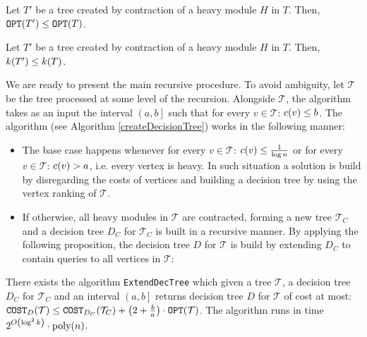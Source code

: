\begin{observation}
\label{monotonicityOfOptContraction}
    Let $T'$ be a tree created by contraction of a heavy module $H$ in $T$. Then, $\texttt{OPT}\mathopen{}\left( T' \right)\leq \texttt{OPT}\mathopen{}\left( T \right)$.
\end{observation}
\begin{observation}\label{monotonicityOfKContracion}
    Let $T'$ be a tree created by contraction of a heavy module $H$ in $T$. Then, $k\mathopen{}\left( T' \right)\leq k\mathopen{}\left( T \right)$.
\end{observation}


We are ready to present the main recursive procedure. To avoid ambiguity, let $\mathcal{T}$ be the tree processed at some level of the recursion. Alongside $\mathcal{T}$, the algorithm takes as an input the interval $\left(a,b\right]$ such that for every $v\in \mathcal{T}$: $c\mathopen{}\left( v \right)\leq b$. 
The algorithm (see Algorithm \ref{createDecisionTree}) works in the following manner: 


\begin{itemize}
    \item The base case happens whenever for every $v\in\mathcal{T}$: $c\mathopen{}\left( v \right)\leq\frac{1}{\log n}$ or for every $v\in\mathcal{T}$: $c\mathopen{}\left( v \right)>a$, i.e. every vertex is heavy. In such situation a solution is build by disregarding the costs of vertices and building a decision tree by using the vertex ranking of $\mathcal{T}$. 
    \item If otherwise, all heavy modules in $\mathcal{T}$ are contracted, forming a new tree $\mathcal{T}_C$ and a decision tree $D_{C}$ for $\mathcal{T}_C$ is built in a recursive manner. By applying the following proposition, the decision tree $D$ for $\mathcal{T}$ is build by extending $D_{C}$ to contain queries to all vertices in $\mathcal{T}$:
\end{itemize}
\begin{proposition}
\label{existanceOfExtensionAlgorithm}
There exists the algorithm \texttt{ExtendDecTree} which given a tree $\mathcal{T}$, a decision tree $D_C$ for $\mathcal{T}_C$ and an interval $\left(a,b\right]$ returns decision tree $D$ for $\mathcal{T}$ of cost at most:
$
\texttt{COST}_{D}\mathopen{}\left( \mathcal{T} \right)\leq \texttt{COST}_{D_C}\mathopen{}\left( \mathcal{T}_C \right)+\mathopen{}\left( 2+\frac{b}{a} \right)\cdot\texttt{OPT}\mathopen{}\left( \mathcal{T} \right)
$.
The algorithm runs in time 
$2^{O\mathopen{}\left( \log^2k \right)}\cdot\text{poly}\mathopen{}\left( n \right)$.   
\end{proposition}

